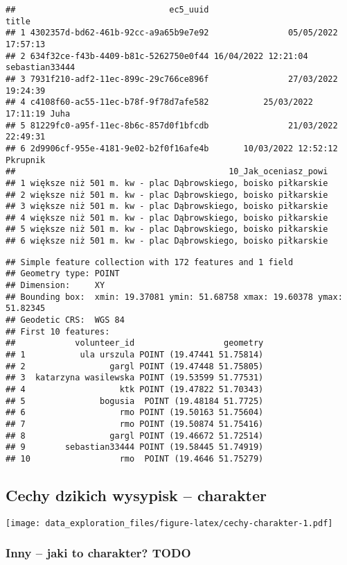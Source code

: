 \documentclass[
]{article}
\begin{document}
\begin{verbatim}
##                               ec5_uuid                              title
## 1 4302357d-bd62-461b-92cc-a9a65b9e7e92                05/05/2022 17:57:13
## 2 634f32ce-f43b-4409-b81c-5262750e0f44 16/04/2022 12:21:04 sebastian33444
## 3 7931f210-adf2-11ec-899c-29c766ce896f                27/03/2022 19:24:39
## 4 c4108f60-ac55-11ec-b78f-9f78d7afe582           25/03/2022 17:11:19 Juha
## 5 81229fc0-a95f-11ec-8b6c-857d0f1bfcdb                21/03/2022 22:49:31
## 6 2d9906cf-955e-4181-9e02-b2f0f16afe4b       10/03/2022 12:52:12 Pkrupnik
##                                           10_Jak_oceniasz_powi
## 1 większe niż 501 m. kw - plac Dąbrowskiego, boisko piłkarskie
## 2 większe niż 501 m. kw - plac Dąbrowskiego, boisko piłkarskie
## 3 większe niż 501 m. kw - plac Dąbrowskiego, boisko piłkarskie
## 4 większe niż 501 m. kw - plac Dąbrowskiego, boisko piłkarskie
## 5 większe niż 501 m. kw - plac Dąbrowskiego, boisko piłkarskie
## 6 większe niż 501 m. kw - plac Dąbrowskiego, boisko piłkarskie
\end{verbatim}

\begin{verbatim}
## Simple feature collection with 172 features and 1 field
## Geometry type: POINT
## Dimension:     XY
## Bounding box:  xmin: 19.37081 ymin: 51.68758 xmax: 19.60378 ymax: 51.82345
## Geodetic CRS:  WGS 84
## First 10 features:
##            volunteer_id                  geometry
## 1           ula urszula POINT (19.47441 51.75814)
## 2                 gargl POINT (19.47448 51.75805)
## 3  katarzyna wasilewska POINT (19.53599 51.77531)
## 4                   ktk POINT (19.47822 51.70343)
## 5               bogusia  POINT (19.48184 51.7725)
## 6                   rmo POINT (19.50163 51.75604)
## 7                   rmo POINT (19.50874 51.75416)
## 8                 gargl POINT (19.46672 51.72514)
## 9        sebastian33444 POINT (19.58445 51.74919)
## 10                  rmo  POINT (19.4646 51.75279)
\end{verbatim}

\hypertarget{cechy-dzikich-wysypisk-charakter}{%
\subsection{Cechy dzikich wysypisk --
charakter}\label{cechy-dzikich-wysypisk-charakter}}

\texttt{[image: data\_exploration\_files/figure-latex/cechy-charakter-1.pdf]}

\hypertarget{inny-jaki-to-charakter-todo}{%
\subsubsection{Inny -- jaki to charakter?
TODO}\label{inny-jaki-to-charakter-todo}}
\end{document}
